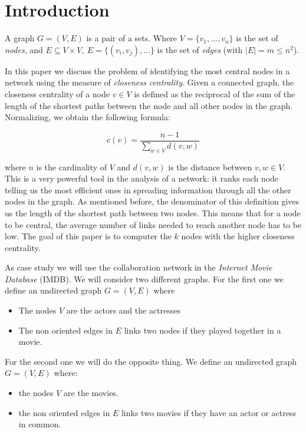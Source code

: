 \section{Introduction}
A graph $G= (V,E)$ is a pair of a sets. Where $V = \{v_1,...,v_n\}$ is the set of \emph{nodes}, and $E \subseteq V \times V, ~ E = \{(v_i,v_j),...\}$  is the set of \emph{edges} (with $|E| = m \leq n^2$). \s

\nd In this paper we discuss the problem of identifying the most central nodes in a network using the measure of \emph{closeness centrality}. Given a connected graph, the closeness centrality of a node $v \in V$ is defined \cite{Sodeur2019} as the reciprocal of the sum of the length of the shortest paths between the node and all other nodes in the graph. Normalizing, we obtain the following formula:

\begin{equation}\label{closeness}
   c(v) = \frac{n-1}{\displaystyle \sum_{w \in V} d(v,w)}
\end{equation}

\nd where $n$ is the cardinality of $V$ and $d(v,w)$ is the distance between $v,w \in V$. This is a very powerful tool in the analysis of a network: it ranks each node telling us the most efficient ones in spreading information through all the other nodes in the graph. As mentioned before, the denominator of this definition gives us the length of the shortest path between two nodes. This means that for a node to be central, the average number of links needed to reach another node has to be low. The goal of this paper is to computer the $k$ nodes with the higher closeness centrality. \s

\noindent As case study we will use the collaboration network in the \emph{Internet Movie Database} (IMDB).  We will consider two different graphs. For the first one we define an undirected graph $G=(V,E)$ where
\begin{itemize}
    \item The nodes $V$ are the actors and the actresses
    \item The non oriented edges in $E$ links two nodes if they played together in a movie.
\end{itemize}
For the second one we will do the opposite thing. We define an undirected graph $G=(V,E)$ where:
\begin{itemize}
    \item the nodes $V$ are the movies.
    \item the non oriented edges in $E$ links two movies if they have an actor or actress in common.
\end{itemize}

